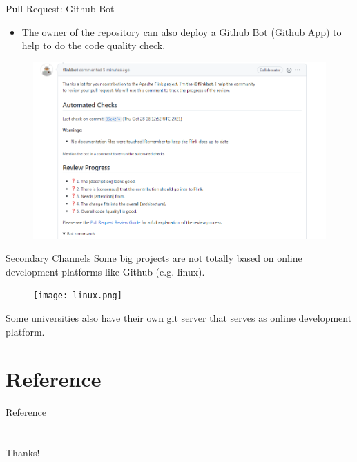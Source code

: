 \documentclass[12pt]{beamer}
\begin{document}
\begin{frame}{Pull Request: Github Bot}
    \begin{itemize}
        \item The owner of the repository can also deploy a Github Bot (Github App) to help to do the code quality check.
    \end{itemize}
    \begin{figure}
        \centering
        \includegraphics[width=0.8\linewidth]{github_bot_apache_flink.png}
        \label{fig:github_bot_apache_flink}
    \end{figure}
\end{frame}
\begin{frame}{Secondary Channels}
    Some big projects are not totally based on online development platforms like Github (e.g. linux).
    \begin{figure}
        \centering
        \texttt{[image: linux.png]}
        \label{fig:linux}
    \end{figure}
    Some universities also have their own git server that serves as online development platform.
\end{frame}
\section{Reference}
\begin{frame}{Reference}
    \printbibliography
\end{frame}
\section{}
\begin{frame}{}
    \begin{center}
        \Huge Thanks!
    \end{center}
\end{frame}
\end{document}
